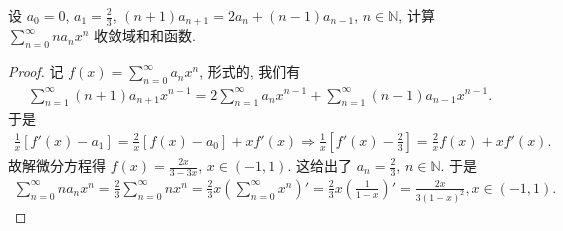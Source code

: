 \documentclass[../../main.tex]{subfiles}%
\begin{document}
\begin{example}
设 $a_0 = 0$, $a_1 = \frac{2}{3}$, $(n + 1)a_{n+1} = 2a_n + (n - 1)a_{n-1}$, $n \in \mathbb{N}$, 计算 $\sum_{n=0}^{\infty} n a_n x^n$ 收敛域和和函数.
\end{example}
\begin{proof}

记 $f(x) = \sum_{n=0}^{\infty} a_n x^n$, 形式的, 我们有
\begin{align*}
\sum_{n=1}^{\infty} (n + 1) a_{n+1} x^{n - 1} = 2 \sum_{n=1}^{\infty} a_n x^{n - 1} + \sum_{n=1}^{\infty} (n - 1) a_{n-1} x^{n - 1}.
\end{align*}
于是
\begin{align*}
\frac{1}{x} [f'(x) - a_1] = \frac{2}{x} [f(x) - a_0] + x f'(x) \Rightarrow \frac{1}{x} \left[ f'(x) - \frac{2}{3} \right] = \frac{2}{x} f(x) + x f'(x).
\end{align*}
故解微分方程得 $f(x) = \frac{2x}{3 - 3x}$, $x \in (-1,1)$. 这给出了 $a_n = \frac{2}{3}$, $n \in \mathbb{N}$. 于是
\begin{align*}
\sum_{n=0}^{\infty} n a_n x^n = \frac{2}{3} \sum_{n=0}^{\infty} n x^n = \frac{2}{3} x \left( \sum_{n=0}^{\infty} x^n \right)' = \frac{2}{3} x \left( \frac{1}{1 - x} \right)' = \frac{2x}{3(1 - x)^2}, x \in (-1,1).
\end{align*}

\end{proof}
\end{document}
